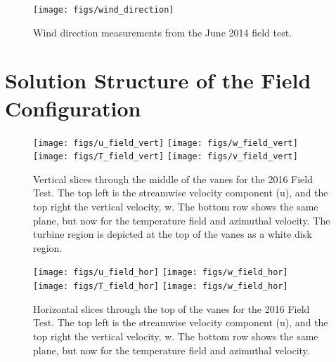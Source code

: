  \begin{figure}[!htb]
  \begin{center}
   \texttt{[image: figs/wind\_direction]}
   \caption{Wind direction measurements from the June 2014 field test.}
   \label{fig:wind_direction}
  \end{center}
 \end{figure}



\section{Solution Structure of the Field Configuration}
\label{subsec:field_predict}

\begin{figure}[!htb]
  \centering
  \texttt{[image: figs/u\_field\_vert]}
  \hfill
  \texttt{[image: figs/w\_field\_vert]}
  \\
  \texttt{[image: figs/T\_field\_vert]}
  \hfill
  \texttt{[image: figs/v\_field\_vert]}
  \label{fig:field_vert}
 \caption{Vertical slices through the middle of the vanes for the
 2016 Field Test. The top left is the streamwise velocity component
 (u), and the top right the vertical velocity, w. The bottom row shows
 the same plane, but now for the temperature field and azimuthal
 velocity. The turbine region is depicted at the top of the vanes as a
 white disk region.} 
\end{figure}

\begin{figure}[!htb]
  \centering
  \texttt{[image: figs/u\_field\_hor]}
  \hfill
  \texttt{[image: figs/w\_field\_hor]}
  \\
  \texttt{[image: figs/T\_field\_hor]}
  \hfill
  \texttt{[image: figs/w\_field\_hor]}
  \label{fig:field_hor}
 \caption{Horizontal slices through the top of the vanes for the
 2016 Field Test. The top left is the streamwise velocity component
 (u), and the top right the vertical velocity, w. The bottom row shows
 the same plane, but now for the temperature field and azimuthal velocity.} 
\end{figure}

